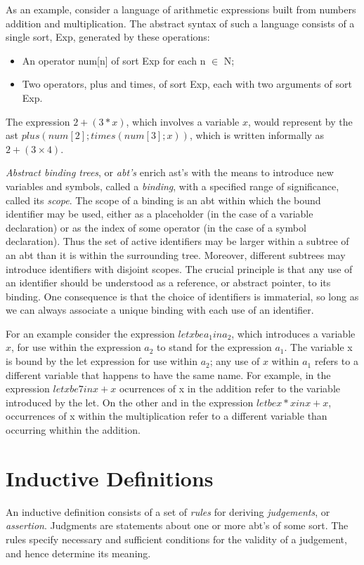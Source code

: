 As an example, consider a language of arithmetic expressions built from numbers
addition and multiplication. The abstract syntax of such a language consists of
a single sort, Exp, generated by these operations:

\begin{itemize}
    \item An operator num[n] of sort Exp for each n $\in$ N\@;
    \item Two operators, plus and times, of sort Exp, each with two
    arguments of sort Exp.
\end{itemize}

The expression $2+(3 * x)$, which involves a variable $x$, would represent by
the ast $plus(num[2]; times(num[3]; x))$, which is written informally as $2 +
(3 \times 4)$.  

\textit{Abstract binding trees}, or \textit{abt's} enrich ast's with
the means to introduce new variables and symbols, called a
\textit{binding}, with a specified range of significance, called its
\textit{scope}. The scope of a binding is an abt within which the bound
identifier may be used, either as a placeholder (in the case of a
variable declaration) or as the index of some operator (in the case of
a symbol declaration). Thus the set of active identifiers may be larger
within a subtree of an abt than it is within the surrounding tree.
Moreover, different subtrees may introduce identifiers with disjoint
scopes. The crucial principle is that any use of an identifier should
be understood as a reference, or abstract pointer, to its binding. One
consequence is that the choice of identifiers is immaterial, so long as
we can always associate a unique binding with each use of an
identifier.

For an example consider the expression $let x be a_1 in a_2$, which
introduces a variable $x$, for use within the expression $a_2$ to stand
for the expression $a_1$. The variable x is bound by the let expression
for use within $a_2$; any use of $x$ within $a_1$ refers to a different
variable that happens to have the same name. For example, in the
expression $let x be 7 in x+x$ ocurrences of x in the addition refer to
the variable introduced by the let. On the other and in the expression
$let be x*x in x+x$, occurrences of x within the multiplication refer
to a different variable than occurring whithin the addition.

\section{Inductive Definitions}
An inductive definition consists of a set of \textit{rules} for deriving
\textit{judgements}, or \textit{assertion}. Judgments are statements
about one or more abt's of some sort.  The rules specify necessary and
sufficient conditions for the validity of a judgement, and hence
determine its meaning.

